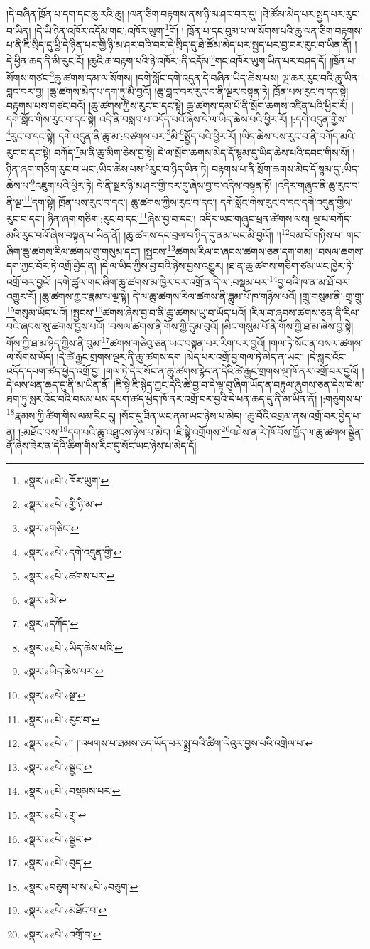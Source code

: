 །དེ་བཞིན་ཁྲོན་པ་དག་དང་ཆུ་རའི་ཆུ། །ལན་ཅིག་བརྟགས་ནས་ཉི་མ་ཤར་བར་དུ། །ཐེ་ཚོམ་མེད་པར་སྤྱད་པར་རུང་བ་ཡིན། །དེ་ཡི་ཉེན་འཁོར་འདོམ་གང་:འཁོར་ཡུག་\footnote{«སྣར་»«པེ་»ཁོར་ཡུག་}གོ། །
ཁྲོན་པ་དང་བུམ་པ་ལ་སོགས་པའི་ཆུ་ལན་ཅིག་བརྟགས་པ་ནི་ཇི་སྲིད་དུ་ཕྱི་དེ་ཉིན་པར་གྱི་ཉི་མ་ཤར་བའི་བར་དེ་སྲིད་དུ་ཐེ་ཚོམ་མེད་པར་སྤྱད་པར་བྱ་བར་རུང་བ་ཡིན་ནོ། །དེ་ཕྱིན་ཆད་ནི་མི་རུང་ངོ། །ཆུའི་ཆ་བརྟག་པའི་ཉེ་འཁོར་:ནི་འདོམ་\footnote{«སྣར་»«པེ་»གྱི་ཉི་མ་}གང་འཁོར་ཡུག་ཡིན་པར་བཤད་དོ། །ཁྲོན་པ་སོགས་གཙང་\footnote{«སྣར་»གཅིང་}ཆུ་ཚགས་དམ་ལ་སོགས། །དགེ་སློང་དགེ་འདུན་དེ་བཞིན་ཡིད་ཆེས་པས། ལྔ་ཆར་རུང་བའི་ཆུ་ཡིན་བླང་བར་བྱ། །ཆུ་ཚགས་མེད་པ་དག་ཏུ་མི་བྱའོ། །ཆུ་བླང་བར་རུང་བ་ནི་ལྔར་བསྟན་ཏེ། ཁྲོན་པས་རུང་བ་དང་སྟེ། བརྟགས་པས་གཙང་བའོ། །ཆུ་ཚགས་ཀྱིས་རུང་བ་དང་སྟེ། ཆུ་ཚགས་དམ་པོ་ནི་སྲོག་ཆགས་འཛིན་པའི་ཕྱིར་རོ། །དགེ་སློང་གིས་རུང་བ་དང་སྟེ། འདི་ནི་བསླབ་པ་འདོད་པའོ་ཞེས་དེ་ལ་ཡིད་ཆེས་པའི་ཕྱིར་རོ། །:དགེ་འདུན་གྱིས་\footnote{«སྣར་»«པེ་»དགེ་འདུན་གྱི་}རུང་བ་དང་སྟེ། དགེ་འདུན་ནི་ཆུ་མ་:བཙགས་པར་\footnote{«སྣར་»«པེ་»ཚགས་པར་}མི་\footnote{«སྣར་»མེ་}སྤྱོད་པའི་ཕྱིར་རོ། །ཡིད་ཆེས་པས་རུང་བ་ནི་བཀོད་མའི་རུང་བ་དང་སྟེ། བཀོད་\footnote{«སྣར་»དཀོད་}མ་ནི་ཆུ་མིག་ཅེས་བྱ་སྟེ། དེ་ལ་སྲོག་ཆགས་མེད་དོ་སྙམ་དུ་ཡིད་ཆེས་པའི་དབང་གིས་སོ། །ཉིན་ཞག་གཅིག་རུང་བ་ཡང་:ཡིད་ཆེས་པས་\footnote{«སྣར་»«པེ་»ཡིད་ཆེས་པའི་}རུང་བ་ཉིད་ཡིན་ཏེ། བརྟགས་པ་ནི་སྲོག་ཆགས་མེད་དོ་སྙམ་དུ་:ཡིད་ཆེས་པ་\footnote{«སྣར་»ཡིད་ཆེས་པར་}འཇུག་པའི་ཕྱིར་ཏེ། དེ་ནི་སྔར་ཉི་མ་ཤར་གྱི་བར་དུ་ཞེས་བྱ་བ་འདིས་བསྟན་ཏོ། །འདིར་གཞུང་ནི་ཆུ་རུང་བ་ནི་ལྔ་\footnote{«སྣར་»«པེ་»སྔ་}དག་སྟེ། ཁྲོན་པས་རུང་བ་དང་། ཆུ་ཚགས་ཀྱིས་རུང་བ་དང་། དགེ་སློང་གིས་རུང་བ་དང་དགེ་འདུན་གྱིས་རུང་བ་དང་། ཉིན་ཞག་གཅིག་:རུང་བ་དང་\footnote{«སྣར་»«པེ་»རུང་བ་}ཞེས་བྱ་བ་དང་། འདིར་ཡང་གཞུང་ཕྲན་ཚེགས་ལས། ལྔ་པ་བཀོད་མའི་རུང་བའོ་ཞེས་བསྟན་པ་ཡིན་ནོ། །ཆུ་ཚགས་དང་བྲལ་བ་ཉིད་དུ་ནམ་ཡང་མི་བྱའོ།། །།\footnote{«སྣར་»«པེ་»།། །།འཕགས་པ་ཐམས་ཅད་ཡོད་པར་སྨྲ་བའི་ཚིག་ལེའུར་བྱས་པའི་འགྲེལ་པ་}བམ་པོ་གཉིས་པ། གང་ཞིག་ཆུ་ཚགས་རིལ་ཚགས་གྲུ་གསུམ་དང་། །སྤྱངས་\footnote{«སྣར་»«པེ་»སྦྱང་}ཚགས་རིལ་བ་ཞབས་ཚགས་ཅན་དག་གམ། །བསལ་ཆགས་དག་ཀྱང་བོར་ཏེ་འགྲོ་བྱེད་ན། །དེ་ལ་ཡིད་ཀྱིས་བྱ་བའི་ཉེས་བྱས་འགྱུར། །ཐ་ན་ཆུ་ཚགས་གཅིག་ཙམ་ཡང་ཁྱེར་ཏེ་འགྲོ་བར་བྱའོ། །དགེ་ཚུལ་གང་ཞིག་ཆུ་ཚགས་མ་ཁྱེར་བར་འགྲོ་ན་དེ་ལ་:བསྡམ་པར་\footnote{«སྣར་»«པེ་»བསྡམས་པར་}བྱ་བའི་ཁ་ན་མ་ཐོ་བར་འགྱུར་རོ། །ཆུ་ཚགས་ཀྱང་རྣམ་པ་ལྔ་སྟེ། དེ་ལ་ཆུ་ཚགས་རིལ་ཚགས་ནི་ཟླུམ་པོ་ཁ་གཉིས་པའོ། །གྲུ་གསུམ་ནི་:གྲྭ་གྲུ་\footnote{«སྣར་»«པེ་»གྲྭ་}གསུམ་ཡོད་པའོ། །སྤྱངས་\footnote{«སྣར་»«པེ་»སྦྱང་}ཚགས་ཞེས་བྱ་བ་ནི་ཆུ་ཚགས་ཡུ་བ་ཡོད་པའོ། །རིལ་བ་ཞབས་ཚགས་ཅན་ནི་རིལ་བའི་ཞབས་སུ་ཚགས་བྱས་པའོ། །བསལ་ཚགས་ནི་གོས་ཀྱི་དུམ་བུའོ། །མིང་གསུམ་པོ་ནི་གོས་ཀྱི་ཐ་མ་ཞེས་བྱ་སྟེ། གོས་ཀྱི་ཐ་མ་ཉིད་ཀྱིས་ནི་བུམ་\footnote{«སྣར་»«པེ་»བུད་}ཚགས་གཅེའུ་ཅན་ཡང་བསྟན་པར་རིག་པར་བྱའོ། །གལ་ཏེ་སོང་ན་བསལ་ཚགས་ལ་སོགས་ཡོད། །དེ་ཚེ་རྒྱང་གྲགས་ལྔར་ནི་ཆུ་ཚགས་དག །མེད་པར་འགྲོ་བྱ་གལ་ཏེ་མེད་ན་ཡང་། །དེ་སླར་འོང་འདོད་དཔག་ཚད་ཕྱེད་འགྲོ་བྱ། །གལ་ཏེ་དེར་སོང་ན་ཆུ་ཚགས་རྙེད་ན་དེའི་ཚེ་རྒྱང་གྲགས་ལྔ་ཁོ་ནར་འགྲོ་བར་བྱའོ། །དེ་ལས་ཕན་ཆད་དུ་ནི་མ་ཡིན་ནོ། །ཇི་སྟེ་ཇི་སྙེད་ཀྱང་དེའི་ཚེ་བྱ་བ་དེ་ལྟ་བུ་ཞིག་ཡོད་ན་བརྟུལ་ཞུགས་ཅན་དེས་དེ་མ་ཐག་ཏུ་སླར་འོང་བའི་བསམ་པས་དཔག་ཚད་ཕྱེད་ཁོ་ནར་འགྲོ་བར་བྱའི་དེ་ཕན་ཆད་དུ་ནི་མ་ཡིན་ནོ། །:གཅུགས་པ་\footnote{«སྣར་»བཅུག་པ་ས་«པེ་»བཅུག་}རྣམས་ཀྱི་ཚིག་གིས་ལམ་རིང་དུ། །སོང་དུ་ཟིན་ཡང་ནམ་ཡང་ཉེས་པ་མེད། །ཆུ་བོའི་འགྲམ་ནས་འགྲོ་བར་བྱེད་པ་ན། །:མཐོང་བས་\footnote{«སྣར་»«པེ་»མཐོང་བ་}དག་པའི་ཆུ་འཐུངས་ཉེས་པ་མེད། །ཇི་སྟེ་འགྲོགས་\footnote{«སྣར་»«པེ་»འགྲོ་བ་}བཤེས་ན་རེ་ཁོ་བོས་ཁྱོད་ལ་ཆུ་ཚགས་སྦྱིན་ནོ་ཞེས་ཟེར་ན་དེའི་ཚིག་གིས་རིང་དུ་སོང་ཡང་ཉེས་པ་མེད་དོ། 